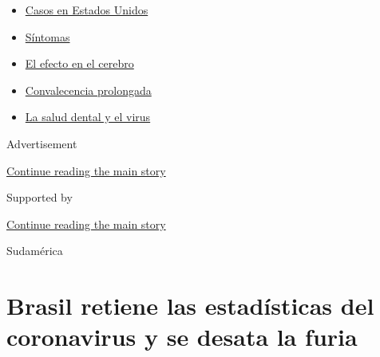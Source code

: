 \begin{itemize}
\tightlist
\item
  \href{https://www.nytimes3xbfgragh.onion/es/interactive/2020/espanol/mundo/coronavirus-en-estados-unidos.html?name=styln-coronavirus-es\&region=TOP_BANNER\&block=storyline_menu_recirc\&action=click\&pgtype=Article\&impression_id=6fc61761-f4c1-11ea-9caa-f145e0172db9\&variant=undefined}{Casos
  en Estados Unidos}
\item
  \href{https://www.nytimes3xbfgragh.onion/es/interactive/2020/08/06/espanol/ciencia-y-tecnologia/tengo-covid-19-sintomas.html?name=styln-coronavirus-es\&region=TOP_BANNER\&block=storyline_menu_recirc\&action=click\&pgtype=Article\&impression_id=6fc61762-f4c1-11ea-9caa-f145e0172db9\&variant=undefined}{Síntomas}
\item
  \href{https://www.nytimes3xbfgragh.onion/es/2020/09/11/espanol/ciencia-y-tecnologia/cerebro-coronavirus.html?name=styln-coronavirus-es\&region=TOP_BANNER\&block=storyline_menu_recirc\&action=click\&pgtype=Article\&impression_id=6fc61763-f4c1-11ea-9caa-f145e0172db9\&variant=undefined}{El
  efecto en el cerebro}
\item
  \href{https://www.nytimes3xbfgragh.onion/es/2020/09/09/espanol/ciencia-y-tecnologia/salud-mental-coronavirus.html?name=styln-coronavirus-es\&region=TOP_BANNER\&block=storyline_menu_recirc\&action=click\&pgtype=Article\&impression_id=6fc61764-f4c1-11ea-9caa-f145e0172db9\&variant=undefined}{Convalecencia
  prolongada}
\item
  \href{https://www.nytimes3xbfgragh.onion/es/2020/09/08/espanol/ciencia-y-tecnologia/dentistas-covid-dientes.html?name=styln-coronavirus-es\&region=TOP_BANNER\&block=storyline_menu_recirc\&action=click\&pgtype=Article\&impression_id=6fc61765-f4c1-11ea-9caa-f145e0172db9\&variant=undefined}{La
  salud dental y el virus}
\end{itemize}

Advertisement

\protect\hyperlink{after-top}{Continue reading the main story}

Supported by

\protect\hyperlink{after-sponsor}{Continue reading the main story}

Sudamérica

\hypertarget{brasil-retiene-las-estaduxedsticas-del-coronavirus-y-se-desata-la-furia}{%
\section{Brasil retiene las estadísticas del coronavirus y se desata la
furia}\label{brasil-retiene-las-estaduxedsticas-del-coronavirus-y-se-desata-la-furia}}

